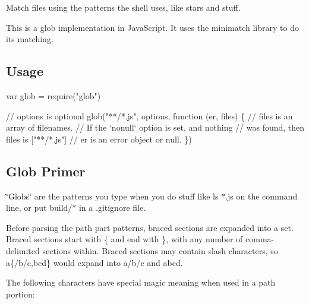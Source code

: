 Match files using the patterns the shell uses, like stars and stuff.

\href{https://travis-ci.org/isaacs/node-glob/}{\tt } \href{https://ci.appveyor.com/project/isaacs/node-glob}{\tt } \href{https://coveralls.io/github/isaacs/node-glob?branch=master}{\tt }

This is a glob implementation in Java\+Script. It uses the {\ttfamily minimatch} library to do its matching.



\subsection*{Usage}


\begin{DoxyCode}
var glob = require("glob")

// options is optional
glob("**/*.js", options, function (er, files) \{
  // files is an array of filenames.
  // If the `nonull` option is set, and nothing
  // was found, then files is ["**/*.js"]
  // er is an error object or null.
\})
\end{DoxyCode}


\subsection*{Glob Primer}

\char`\"{}\+Globs\char`\"{} are the patterns you type when you do stuff like {\ttfamily ls $\ast$.js} on the command line, or put {\ttfamily build/$\ast$} in a {\ttfamily .gitignore} file.

Before parsing the path part patterns, braced sections are expanded into a set. Braced sections start with {\ttfamily \{} and end with {\ttfamily \}}, with any number of comma-\/delimited sections within. Braced sections may contain slash characters, so {\ttfamily a\{/b/c,bcd\}} would expand into {\ttfamily a/b/c} and {\ttfamily abcd}.

The following characters have special magic meaning when used in a path portion\+:


